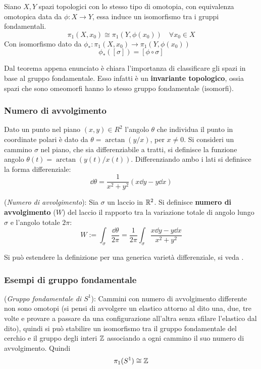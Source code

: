 \begin{theorem}
   Siano $X,Y$ spazi topologici con lo stesso tipo di omotopia, con equivalenza
   omotopica data da $\phi : X \to Y$, essa induce un isomorfismo tra i gruppi
   fondamentali.
   $$
      \pi_1(X,x_0) \cong \pi_1 (Y, \phi(x_0)) \quad \forall x_0 \in X
   $$
   Con isomorfismo dato da $\phi_* : \pi_1 (X,x_0) \to \pi_1 (Y,\phi(x_0))$
   $$
      \phi_*([\sigma]) = [\phi \circ \sigma]
   $$
\end{theorem}

Dal teorema appena enunciato è chiara l'importanza di classificare gli spazi in
base al gruppo fondamentale. Esso infatti è un \textbf{invariante topologico},
ossia spazi che sono omeomorfi hanno lo stesso gruppo fondamentale (isomorfi).\\

\subsubsection{Numero di avvolgimento}

Dato un punto nel piano $(x,y) \in R^2$ l'angolo $\theta$ che individua il punto
in coordinate polari è dato da $\theta = \arctan(y/x)$, per $x \neq 0$. Si consideri
un cammino $\sigma$ nel piano, che sia differenziabile a tratti, si definisce
la funzione angolo $\theta(t) = \arctan (y(t)/x(t))$. Differenziando ambo i lati si
definisce la forma differenziale:
$$
  \dd \theta = \frac{1}{x^2+y^2}(x \dd y - y \dd x)
$$
\begin{definition}(\emph{Numero di avvolgimento}):
  Sia $\sigma$ un laccio in $\mathbb{R}^2$. Si definisce \textbf{numero di avvolgimento} ($W$)
  del laccio il rapporto tra la variazione totale di angolo lungo $\sigma$ e
  l'angolo totale $2\pi$:
  $$
     W := \int_\sigma \frac{\dd \theta}{2\pi}
        = \frac{1}{2\pi} \int_\sigma \frac{x \dd y - y \dd x}{x^2 + y^2}
  $$
\end{definition}
Si può estendere la definizione per una generica varietà differenziale, si veda
\cite{fulton}.\\


\subsubsection{Esempi di gruppo fondamentale}
\begin{example}
   (\emph{Gruppo fondamentale di $S^1$}): Cammini con numero di avvolgimento differente
   non sono omotopi (si pensi di avvolgere un elastico attorno al dito una, due, tre
   volte e provare a passare da una configurazione all'altra senza sfilare l'elastico
   dal dito), quindi si può stabilire un isomorfismo tra il gruppo fondamentale
   del cerchio e il gruppo degli interi $\mathbb{Z}$ associando a ogni cammino il suo numero
   di avvolgimento. Quindi
   $$
      \pi_1 (S^1) \cong \mathbb{Z}
   $$
\end{example}


